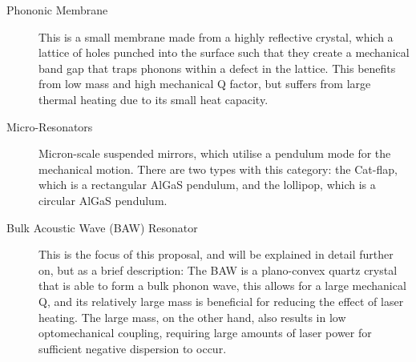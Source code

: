 \documentclass[aps,  
                a4paper, 
                amsmath, 
                amssymb, 
                preprint,
                tightenlines,  
                amsfonts,
                nofootinbib,
                onecolumn,
                titlepage,
                10pt
            ]{revtex4-2}
\begin{document}
    \begin{description}
        \item[Phononic Membrane] This is a small membrane made from a highly reflective crystal, which a lattice of holes punched into the surface such that they create a mechanical band gap that traps phonons within a defect in the lattice. This benefits from low mass and high mechanical Q factor, but suffers from large thermal heating due to its small heat capacity.
        \item[Micro-Resonators] Micron-scale suspended mirrors, which utilise a pendulum mode for the mechanical motion. There are two types with this category: the Cat-flap, which is a rectangular AlGaS pendulum, and the lollipop, which is a circular AlGaS pendulum.
        \item[Bulk Acoustic Wave (BAW) Resonator] This is the focus of this proposal, and will be explained in detail further on, but as a brief description: The BAW is a plano-convex quartz crystal that is able to form a bulk phonon wave, this allows for a large mechanical Q, and its relatively large mass is beneficial for reducing the effect of laser heating. The large mass, on the other hand, also results in low optomechanical coupling, requiring large amounts of laser power for sufficient negative dispersion to occur.
    \end{description}
    
\end{document}
